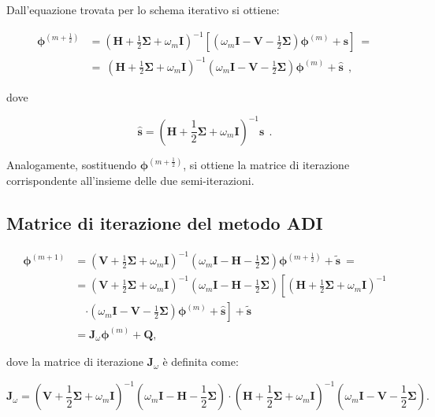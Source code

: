 Dall'equazione trovata per lo schema iterativo si ottiene:

\[\begin{aligned}
\mathbf{\phi}^{\left(m+\frac{1}{2}\right)}&= \left(\mathbf{H} + \frac{1}{2} \mathbf{\Sigma} + \omega_m \mathbf{I}\right)^{-1} \left[ \left(\omega_m \mathbf{I} - \mathbf{V} - \frac{1}{2} \mathbf{\Sigma}\right) \mathbf{\phi}^{(m)} + \mathbf{s} \right]\ =\\
&=\ \left(\mathbf{H} + \frac{1}{2} \mathbf{\Sigma} + \omega_m \mathbf{I}\right)^{-1} \left(\omega_m \mathbf{I} - \mathbf{V} - \frac{1}{2} \mathbf{\Sigma}\right) \mathbf{\phi}^{(m)} + \hat{\mathbf{s}}\ \ ,\end{aligned}
\]

dove

\[
\hat{\mathbf{s}} = \left(\mathbf{H} + \frac{1}{2} \mathbf{\Sigma} + \omega_m \mathbf{I}\right)^{-1} \mathbf{s}\ \ .
\]

Analogamente, sostituendo \(\mathbf{\phi}^{\left(m+\frac{1}{2}\right)}\), si ottiene la matrice di iterazione corrispondente all'insieme delle due semi-iterazioni.



\subsection{Matrice di iterazione del metodo ADI}

\[
\begin{aligned}
	\mathbf{\phi}^{(m+1)} &= \left(\mathbf{V} + \frac{1}{2} \mathbf{\Sigma} + \omega_m \mathbf{I}\right)^{-1} \left(\omega_m \mathbf{I} - \mathbf{H} - \frac{1}{2} \mathbf{\Sigma}\right) \mathbf{\phi}^{\left(m+\frac{1}{2}\right)} + \tilde{\mathbf{s}}\ = \\
	&= \left(\mathbf{V} + \frac{1}{2} \mathbf{\Sigma} + \omega_m \mathbf{I}\right)^{-1} \left(\omega_m \mathbf{I} - \mathbf{H} - \frac{1}{2} \mathbf{\Sigma}\right) \left[ \left(\mathbf{H} + \frac{1}{2} \mathbf{\Sigma} + \omega_m \mathbf{I}\right)^{-1} \right. \\
	&\quad \left. \cdot \left(\omega_m \mathbf{I} - \mathbf{V} - \frac{1}{2} \mathbf{\Sigma}\right) \mathbf{\phi}^{(m)} + \hat{\mathbf{s}} \right] + \tilde{\mathbf{s}} \\
	&= \mathbf{J}_{\omega} \mathbf{\phi}^{(m)} + \mathbf{Q},
\end{aligned}
\]

dove la matrice di iterazione \(\mathbf{J}_{\omega}\) è definita come:

\[
\mathbf{J}_{\omega} = \left(\mathbf{V} + \frac{1}{2} \mathbf{\Sigma} + \omega_m \mathbf{I}\right)^{-1} \left(\omega_m \mathbf{I} - \mathbf{H} - \frac{1}{2} \mathbf{\Sigma}\right) \cdot \left(\mathbf{H} + \frac{1}{2} \mathbf{\Sigma} + \omega_m \mathbf{I}\right)^{-1} \left(\omega_m \mathbf{I} - \mathbf{V} - \frac{1}{2} \mathbf{\Sigma}\right).
\]


